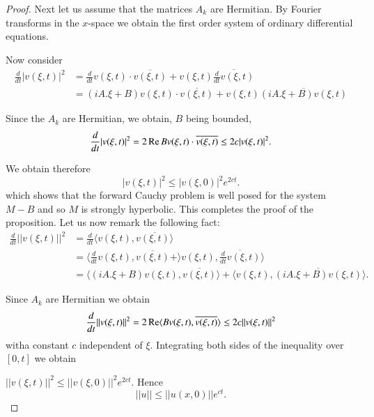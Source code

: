 \begin{proof}
Next let us assume that the matrices $A_k$ are Hermitian. By Fourier
transforms in the $x$-space we obtain the first order system of ordinary
differential equations. 

Now consider
\begin{align*} 
\frac{d}{dt}| v (\xi , t)|^2 & = \frac{d}{dt} v (\xi, t) \cdot
\overline{v(\xi, t)} + v (\xi,  t) \overline{\frac{d}{dt} v(\xi, t)}\\ 
& = (iA. \xi + B ) v (\xi, t) \cdot \overline{v(\xi, t)} + v (\xi,  t)
\overline{(iA. \xi + B ) v (\xi , t)} 
\end{align*}

Since the $A_k$ are Hermitian, we obtain, $B$ being bounded,  
$$
\frac{d}{dt}|v(\xi, t)|^2 = 2 \operatorname{Re} B v (\xi, t) \cdot \overline{v(\xi, t)}
\leq 2 c | v (\xi,  t)|^2.  
$$

We obtain therefore 
\begin{equation}
\left| v(\xi, t) \right|^2 \leq \left| v(\xi, 0) \right|^2 e
^{2ct}. \tag{5.7}\label{chap2-eq5.7} 
\end{equation}
which shows that the forward Cauchy problem is well posed for the
system $M-B$ and so $M$ is strongly hyperbolic. This completes the
proof of the proposition. Let us now remark the following fact:  
\begin{align*}
\frac{d}{dt} || v(\xi, t) ||^2 & = \frac{d}{dt}\langle v(\xi, t),
\overline{v(\xi, t) \rangle} \\ 
& = \langle \frac{d}{dt} v (\xi, t),  \overline{v(\xi, t)} +
\rangle v(\xi, t),  \overline{\frac{d}{dt} v(\xi, t)} \rangle\\ 
& = \langle (iA. \xi + B ) v (\xi, t),  \overline{v(\xi, t) }\rangle +
\langle v(\xi, t),  \overline{(iA.\xi + B ) v (\xi, t)}\rangle.   
\end{align*}

Since $A_k$ are Hermitian we obtain 
$$
\frac{d}{dt}||v(\xi, t) ||^2 = 2 \operatorname{Re} \langle B v(\xi, t),
\overline{v(\xi, t)} \rangle \leq 2 c || v (\xi, t)||^2 
$$
with\pageoriginale a constant $c$ independent of $\xi$. Integrating
both sides of the inequality over $[0,  t]$ we obtain  

$|| v(\xi,  t)||^2 \leq || v(\xi,  0 )||^2 e^{2ct}$. Hence
\begin{equation*}
||u|| \leq || u (x,  0)||e^{ct}. \tag{5.8}\label{chap2-eq5.8}
\end{equation*}


\end{proof}
